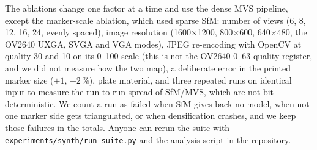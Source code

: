 The ablations change one factor at a time and use the dense MVS pipeline,
except the marker-scale ablation, which used sparse SfM:
number of views (6, 8, 12, 16, 24, evenly spaced), image resolution
(1600$\times$1200, 800$\times$600, 640$\times$480, the OV2640 UXGA, SVGA and
VGA modes), JPEG re-encoding with OpenCV at quality 30 and 10 on its 0--100
scale (this is not the OV2640 0--63 quality register, and we did not measure
how the two map), a deliberate error in the printed marker size
($\pm1$, $\pm2\,\%$), plate material, and three repeated runs on identical
input to measure the run-to-run spread of SfM/MVS, which are not
bit-deterministic. We count a run as failed when SfM gives back no model, when
not one marker side gets triangulated, or when densification crashes, and we
keep those failures in the totals. Anyone can rerun the suite with
\texttt{experiments/synth/run\_suite.py} and the analysis script in the
repository.

